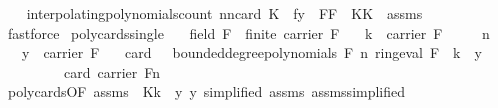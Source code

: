 \begin{isabellebody}
%
\isadelimproof
\ \ %
\endisadelimproof
%
\isatagproof
{}\isamarkupfalse%
\ interpolating{\isacharunderscore}{\kern0pt}polynomials{\isacharunderscore}{\kern0pt}count{\isacharbrackleft}{\kern0pt}\ n{\isacharequal}{\kern0pt}{\isachardoublequoteopen}n{\isacharminus}{\kern0pt}card\ K{\isachardoublequoteclose}\ \ f{\isacharequal}{\kern0pt}{\isachardoublequoteopen}y{\isachardoublequoteclose}\ \ F{\isacharequal}{\kern0pt}{\isachardoublequoteopen}F{\isachardoublequoteclose}\ \ K{\isacharequal}{\kern0pt}{\isachardoublequoteopen}K{\isachardoublequoteclose}{\isacharbrackright}{\kern0pt}\ \ assms\ \isanewline
\ \ \isamarkupfalse%
\ fastforce%
\endisatagproof
{\isafoldproof}%
%
\isadelimproof
\isanewline
%
\endisadelimproof
\isanewline
{}\isamarkupfalse%
\ poly{\isacharunderscore}{\kern0pt}cards{\isacharunderscore}{\kern0pt}single{\isacharcolon}{\kern0pt}\isanewline
\ \ \ {\isachardoublequoteopen}field\ F\ {\isasymand}\ finite\ {\isacharparenleft}{\kern0pt}carrier\ F{\isacharparenright}{\kern0pt}{\isachardoublequoteclose}\isanewline
\ \ \ {\isachardoublequoteopen}k\ {\isasymin}\ carrier\ F{\isachardoublequoteclose}\isanewline
\ \ \ {\isachardoublequoteopen}{}\ {\isasymle}\ n{\isachardoublequoteclose}\isanewline
\ \ \ {\isachardoublequoteopen}y\ {\isasymin}\ carrier\ F{\isachardoublequoteclose}\isanewline
\ \ \ {\isachardoublequoteopen}card\ {\isacharbraceleft}{\kern0pt}{\isasymomega}\ {\isasymin}\ bounded{\isacharunderscore}{\kern0pt}degree{\isacharunderscore}{\kern0pt}polynomials\ F\ n{\isachardot}{\kern0pt}\ ring{\isachardot}{\kern0pt}eval\ F\ {\isasymomega}\ k\ {\isacharequal}{\kern0pt}\ y{\isacharbraceright}{\kern0pt}\ {\isacharequal}{\kern0pt}\ \isanewline
\ \ \ \ \ \ \ \ \ card\ {\isacharparenleft}{\kern0pt}carrier\ F{\isacharparenright}{\kern0pt}{\isacharcircum}{\kern0pt}{\isacharparenleft}{\kern0pt}n{\isacharminus}{\kern0pt}{}{\isacharparenright}{\kern0pt}{\isachardoublequoteclose}\isanewline
%
\isadelimproof
\ \ %
\endisadelimproof
%
\isatagproof
{}\isamarkupfalse%
\ poly{\isacharunderscore}{\kern0pt}cards{\isacharbrackleft}{\kern0pt}OF\ assms{\isacharparenleft}{\kern0pt}{}{\isacharparenright}{\kern0pt}{\isacharcomma}{\kern0pt}\ \ K{\isacharequal}{\kern0pt}{\isachardoublequoteopen}{\isacharbraceleft}{\kern0pt}k{\isacharbraceright}{\kern0pt}{\isachardoublequoteclose}\ \ y{\isacharequal}{\kern0pt}{\isachardoublequoteopen}{\isasymlambda}{\isacharunderscore}{\kern0pt}{\isachardot}{\kern0pt}\ y{\isachardoublequoteclose}{\isacharcomma}{\kern0pt}\ simplified{\isacharbrackright}{\kern0pt}\ assms{\isacharparenleft}{\kern0pt}{}{\isacharparenright}{\kern0pt}\ assms{\isacharparenleft}{\kern0pt}{}{\isacharparenright}{\kern0pt}{\isacharbrackleft}{\kern0pt}simplified{\isacharbrackright}{\kern0pt}\isanewline

\end{isabellebody}
